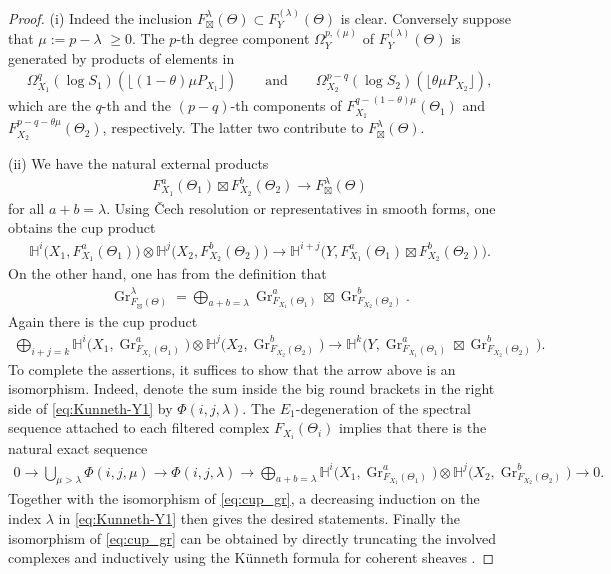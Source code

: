 \documentclass[11pt]{article}
\newcommand{\HH}{\mathbb{H}}
\newcommand{\ddRH}{\Theta}
\newcommand{\flr}[1]{\lfloor #1 \rfloor}
\newcommand{\Gr}{\operatorname{Gr}}
\begin{document}
\begin{proof}(i) Indeed the inclusion $F_\boxtimes^\lambda(\ddRH) \subset F_Y^{(\lambda)}(\ddRH)$ is clear. Conversely suppose that $\mu := p-\lambda$ $\geq 0$. The $p$-th degree component $\Omega_Y^{p,(\mu)}$ of $F_Y^{(\lambda)}(\ddRH)$ is generated by products of elements in
\begin{gather*} \Omega_{X_1}^q(\log S_1)(\flr{(1-\theta)\mu P_{X_1}})\qquad\text{and}\qquad \Omega_{X_2}^{p-q}(\log S_2)(\flr{\theta\mu P_{X_2}}), \end{gather*}
which are the $q$-th and the $(p-q)$-th components of $F_{X_1}^{q-(1-\theta)\mu}(\ddRH_1)$ and $F_{X_2}^{p-q-\theta\mu}(\ddRH_2)$, respectively. The latter two contribute to $F_\boxtimes^\lambda(\ddRH)$.

(ii) We have the natural external products
\begin{gather*} F_{X_1}^a(\ddRH_1)\boxtimes F_{X_2}^b(\ddRH_2)	\to F_\boxtimes^\lambda(\ddRH) \end{gather*}
for all $a+b = \lambda$. Using \v{C}ech resolution or representatives in smooth forms, one obtains the cup product
\begin{gather*} \HH^i\big(X_1,F_{X_1}^a(\ddRH_1)\big)\otimes	\HH^j\big(X_2,F^b_{X_2}(\ddRH_2)\big)\to \HH^{i+j}\big(Y,	F_{X_1}^a(\ddRH_1)\boxtimes F_{X_2}^b(\ddRH_2)\big). \end{gather*}
On the other hand, one has from the definition that
\begin{gather*} \Gr_{F_\boxtimes(\ddRH)}^\lambda = \bigoplus_{a+b=\lambda} \Gr_{F_{X_1}(\ddRH_1)}^a \boxtimes \Gr_{F_{X_2}(\ddRH_2)}^b. \end{gather*}
Again there is the cup product
\begin{gather}\label{eq:cup_gr}
\bigoplus_{i+j=k} \HH^i\big(X_1,\Gr_{F_{X_1}(\ddRH_1)}^a\big)\otimes \HH^j\big(X_2,\Gr_{F_{X_2}(\ddRH_2)}^b\big)\to \HH^k\big(Y, \Gr_{F_{X_1}(\ddRH_1)}^a \boxtimes \Gr_{F_{X_2}(\ddRH_2)}^b \big).
\end{gather}
To complete the assertions, it suffices to show that the arrow above is an isomorphism. Indeed, denote the sum inside the big round brackets in the right side of \eqref{eq:Kunneth-Y1} by $\Phi(i,j,\lambda)$. The $E_1$-degeneration of the spectral sequence attached to each filtered complex $F_{X_i}(\ddRH_i)$ implies that there is the natural exact sequence
\begin{gather*} 0 \to \bigcup_{\mu>\lambda} \Phi(i,j,\mu) \to \Phi(i,j,\lambda) \to\bigoplus_{a+b=\lambda} \HH^i\big(X_1,\Gr_{F_{X_1}(\ddRH_1)}^a\big) \otimes \HH^j\big(X_2,\Gr_{F_{X_2}(\ddRH_2)}^b\big) \to 0. \end{gather*}
Together with the isomorphism of \eqref{eq:cup_gr}, a decreasing induction on the index $\lambda$ in \eqref{eq:Kunneth-Y1} then gives the desired statements. Finally the isomorphism of \eqref{eq:cup_gr} can be obtained by directly truncating the involved complexes and inductively using the K\"unneth formula for coherent sheaves \cite[Theorem~1]{SW}.
\end{proof}
\end{document}
